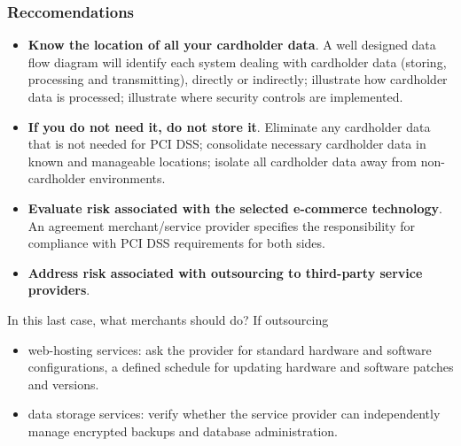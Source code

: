 \documentclass[a4paper, 10pt, titlepage]{article}
\begin{document}
\subsubsection*{Reccomendations}
\begin{itemize}
\item \textbf{Know the location of all your cardholder data}. A well designed data flow diagram will identify each system dealing with cardholder data (storing, processing and transmitting), directly or indirectly; illustrate how cardholder data is processed; illustrate where security controls are implemented.
\item \textbf{If you do not need it, do not store it}. Eliminate any cardholder data that is not needed for PCI DSS; consolidate necessary cardholder data in known and manageable locations; isolate all cardholder data away from non-cardholder environments.
\item \textbf{Evaluate risk associated with the selected e-commerce technology}. An agreement merchant/service provider specifies the responsibility for compliance with PCI DSS requirements for both sides.
\item \textbf{Address risk associated with outsourcing to third-party service providers}.
\end{itemize}
In this last case, what merchants should do? If outsourcing
\begin{itemize}
\item web-hosting services: ask the provider for standard hardware and software configurations, a defined schedule for updating hardware and software patches and versions.
\item data storage services: verify whether the service provider can independently manage encrypted backups and database administration.
\end{itemize}

\newpage %
\end{document}
